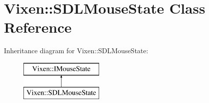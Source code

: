 \hypertarget{class_vixen_1_1_s_d_l_mouse_state}{}\section{Vixen\+:\+:S\+D\+L\+Mouse\+State Class Reference}
\label{class_vixen_1_1_s_d_l_mouse_state}
Inheritance diagram for Vixen\+:\+:S\+D\+L\+Mouse\+State\+:\begin{figure}[H]
\begin{center}
\leavevmode
\includegraphics[height=2.000000cm]{class_vixen_1_1_s_d_l_mouse_state}
\end{center}
\end{figure}
